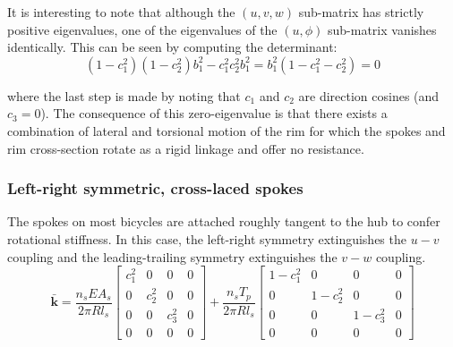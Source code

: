 \documentclass[\rootdir/thesis.tex]{subfiles}
\begin{document}
It is interesting to note that although the $(u,v,w)$ sub-matrix has strictly positive eigenvalues, one of the eigenvalues of the $(u,\phi)$ sub-matrix vanishes identically. This can be seen by computing the determinant:
\begin{equation}
(1-c_1^2)(1-c_2^2)b_1^2 - c_1^2c_2^2b_1^2 = b_1^2(1 - c_1^2 - c_2^2) = 0
\end{equation}

where the last step is made by noting that $c_1$ and $c_2$ are direction cosines (and $c_3=0$). The consequence of this zero-eigenvalue is that there exists a combination of lateral and torsional motion of the rim for which the spokes and rim cross-section rotate as a rigid linkage and offer no resistance.

\subsubsection{Left-right symmetric, cross-laced spokes}
The spokes on most bicycles are attached roughly tangent to the hub to confer rotational stiffness. In this case, the left-right symmetry extinguishes the $u-v$ coupling and the leading-trailing symmetry extinguishes the $v-w$ coupling.
\begin{equation}
\label{eq:kbar_symm_ncross}
\bar{\mathbf{k}} = \frac{n_s EA_s}{2\pi R l_s}
\begin{bmatrix}
c_1^2     & 0     & 0 & 0\\
0 & c_2^2 & 0     & 0\\
0 & 0     & c_3^2 & 0\\
0 & 0     & 0     & 0
\end{bmatrix} +
\frac{n_s T_p}{2\pi R l_s}
\begin{bmatrix}
1-c_1^2 & 0       & 0       & 0\\
0       & 1-c_2^2 & 0       & 0\\
0       & 0       & 1-c_3^2 & 0\\
0       & 0       & 0       & 0
\end{bmatrix}
\end{equation}
\end{document}
